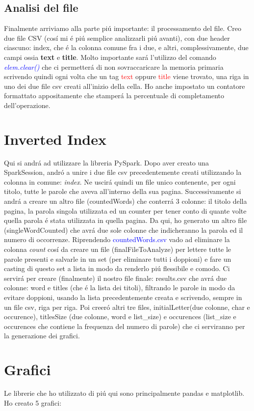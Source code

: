 \documentclass[12pt,a4paper]{article}
\begin{document}
    \subsection{Analisi del file}
    Finalmente arriviamo alla parte piú importante: il processamento del file.
    \newline
    Creo due file CSV (cosí mi é piú semplice analizzarli piú avanti), con due header ciascuno: index, che é la colonna comune fra i due, e altri, complessivamente, due campi ossia \textbf{text} e \textbf{title}. Molto importante sará l'utilizzo del comando \textit{\textcolor{blue}{elem.clear()}} che ci permetterá di non sovraccaricare la memoria primaria scrivendo quindi ogni volta che un tag \textcolor{red}{text} oppure \textcolor{red}{title} viene trovato, una riga in uno dei due file csv creati all'inizio della cella.
    \newline
    Ho anche impostato un contatore formattato appositamente che stamperá la percentuale di completamento dell'operazione.
    \section{Inverted Index}
    Qui si andrá ad utilizzare la libreria PySpark. Dopo aver creato una SparkSession, andró a unire i due file csv precedentemente creati utilizzando la colonna in comune: \textit{index}. Ne uscirá quindi un file unico contenente, per ogni titolo, tutte le parole che aveva all'interno della sua pagina. Successivamente si andrá a creare un altro file (countedWords) che conterrá 3 colonne: il titolo della pagina, la parola singola utilizzata ed un counter per tener conto di quante volte quella parola é stata utilizzata in quella pagina.
    Da qui, ho generato un altro file (singleWordCounted) che avrá due sole colonne che indicheranno la parola ed il numero di occorrenze.
    Riprendendo \textcolor{blue}{countedWords.csv} vado ad eliminare la colonna \textit{count} cosí da creare un file (finalFileToAnalyze) per lettere tutte le parole presenti e salvarle in un set (per eliminare tutti i doppioni) e fare un casting di questo set a lista in modo da renderlo piú flessibile e comodo.
    \newline
    Ci servirá per creare (finalmente) il nostro file finale: results.csv che avrá due colonne: word e titles (che é la lista dei titoli), filtrando le parole in modo da evitare doppioni, usando la lista precedentemente creata e scrivendo, sempre in un file csv, riga per riga.
    \newline
    Poi creeró altri tre files, initialLetter(due colonne, char e occurence), titlesSize (due colonne, word e list\_size) e occurences (list\_size e occurences che contiene la frequenza del numero di parole) che ci serviranno per la generazione dei grafici.
    \section{Grafici}
    Le librerie che ho utilizzato di piú qui sono principalmente pandas e matplotlib.
    Ho creato 5 grafici:
    
\end{document}
